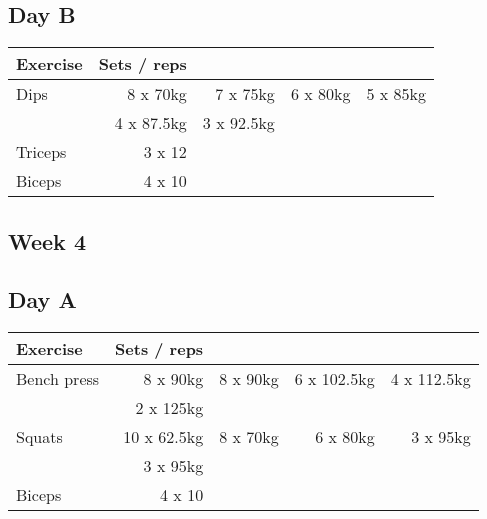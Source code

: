 \documentclass[12pt, a4paper]{article}%
\begin{document}
  \subsection*{\hspace{0.5em} Day B }


  \begin{tabular}{l|rrrr}
  \hspace{0.75em} \textbf{Exercise} & \textbf{Sets / reps} \\ \hline

            \hspace{0.75em} Dips
            & 8 x 70kg
            & 7 x 75kg
            & 6 x 80kg
            & 5 x 85kg
            \\


            \hspace{0.75em}
            & 4 x 87.5kg
            & 3 x 92.5kg
            & 
            & 
            \\


   \hspace{0.75em} Triceps & 3 x 12 \\
   \hspace{0.75em} Biceps & 4 x 10 \\
  \end{tabular}

 \subsection*{\hspace{0.25em} Week 4 }
  \subsection*{\hspace{0.5em} Day A }


  \begin{tabular}{l|rrrr}
  \hspace{0.75em} \textbf{Exercise} & \textbf{Sets / reps} \\ \hline

            \hspace{0.75em} Bench press
            & 8 x 90kg
            & 8 x 90kg
            & 6 x 102.5kg
            & 4 x 112.5kg
            \\


            \hspace{0.75em}
            & 2 x 125kg
            & 
            & 
            & 
            \\


            \hspace{0.75em} Squats
            & 10 x 62.5kg
            & 8 x 70kg
            & 6 x 80kg
            & 3 x 95kg
            \\


            \hspace{0.75em}
            & 3 x 95kg
            & 
            & 
            & 
            \\


   \hspace{0.75em} Biceps & 4 x 10 \\
  \end{tabular}
\end{document}
